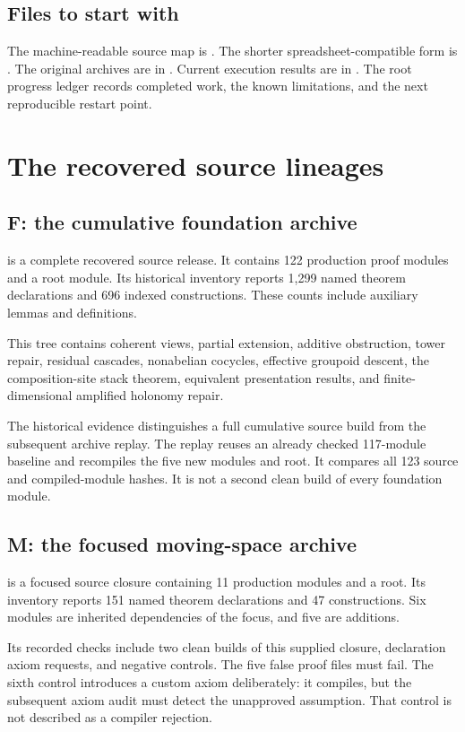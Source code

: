 \documentclass[11pt]{article}
\begin{document}
\subsection*{Files to start with}
The machine-readable source map is . The shorter spreadsheet-compatible form is . The original archives are in . Current execution results are in . The root progress ledger records completed work, the known limitations, and the next reproducible restart point.

\clearpage\section{The recovered source lineages}
\subsection{F: the cumulative foundation archive}
 is a complete recovered source release. It contains 122 production proof modules and a root module. Its historical inventory reports 1,299 named theorem declarations and 696 indexed constructions. These counts include auxiliary lemmas and definitions.

This tree contains coherent views, partial extension, additive obstruction, tower repair, residual cascades, nonabelian cocycles, effective groupoid descent, the composition-site stack theorem, equivalent presentation results, and finite-dimensional amplified holonomy repair.

The historical evidence distinguishes a full cumulative source build from the subsequent archive replay. The replay reuses an already checked 117-module baseline and recompiles the five new modules and root. It compares all 123 source and compiled-module hashes. It is not a second clean build of every foundation module.

\subsection{M: the focused moving-space archive}
 is a focused source closure containing 11 production modules and a root. Its inventory reports 151 named theorem declarations and 47 constructions. Six modules are inherited dependencies of the focus, and five are additions.

Its recorded checks include two clean builds of this supplied closure, declaration axiom requests, and negative controls. The five false proof files must fail. The sixth control introduces a custom axiom deliberately: it compiles, but the subsequent axiom audit must detect the unapproved assumption. That control is not described as a compiler rejection.
\end{document}

